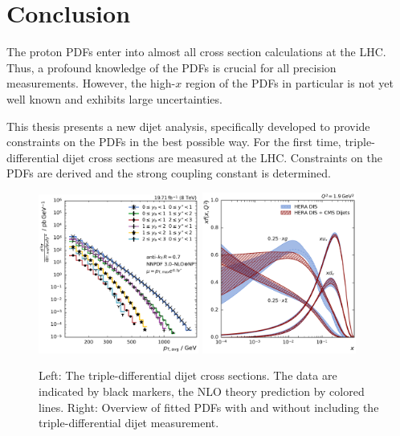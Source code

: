 
\chapter{Conclusion}

The proton PDFs enter into almost all cross section calculations at the LHC. Thus, a
profound knowledge of the PDFs is crucial for all precision measurements.
However, the high-$x$ region of the PDFs in particular is not yet well known and exhibits
large uncertainties.

This thesis presents a new dijet analysis, specifically developed to provide
constraints on the PDFs in the best possible way. For the first time,
triple-differential dijet cross sections are measured at the LHC.
Constraints on the PDFs are derived and the strong coupling constant is
determined.
\\[-6pt]
\begin{figure}[btp]
    \centering
    \includegraphics[width=0.47\textwidth]{figures/measurement/ptavg_spectrum.pdf}\hfill
    \includegraphics[width=0.45\textwidth]{figures/pdf_constraints/pdfcomp_direct_overview_1.9.pdf}
    \caption[Summary plot of results]{Left:
    The triple-differential dijet cross sections. The data are indicated by black
    markers, the NLO theory prediction by colored lines. Right: Overview of
    fitted PDFs with and without including the triple-differential dijet
    measurement.}
    \label{fig:conclusion}
\end{figure}

